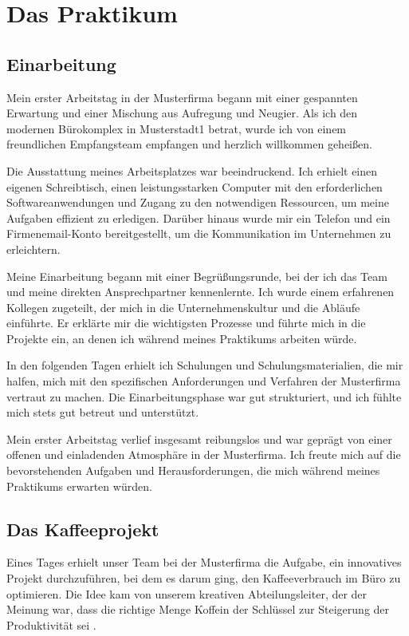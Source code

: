 %
%

\section{Das Praktikum}


\subsection{Einarbeitung}
Mein erster Arbeitstag in der Musterfirma begann mit einer gespannten Erwartung und einer Mischung aus Aufregung und Neugier. Als ich den modernen Bürokomplex in Musterstadt1 betrat, wurde ich von einem freundlichen Empfangsteam empfangen und herzlich willkommen geheißen.

Die Ausstattung meines Arbeitsplatzes war beeindruckend. Ich erhielt einen eigenen Schreibtisch, einen leistungsstarken Computer mit den erforderlichen Softwareanwendungen und Zugang zu den notwendigen Ressourcen, um meine Aufgaben effizient zu erledigen. Darüber hinaus wurde mir ein Telefon und ein Firmenemail-Konto bereitgestellt, um die Kommunikation im Unternehmen zu erleichtern.

Meine Einarbeitung begann mit einer Begrüßungsrunde, bei der ich das Team und meine direkten Ansprechpartner kennenlernte. Ich wurde einem erfahrenen Kollegen zugeteilt, der mich in die Unternehmenskultur und die Abläufe einführte. Er erklärte mir die wichtigsten Prozesse und führte mich in die Projekte ein, an denen ich während meines Praktikums arbeiten würde.

In den folgenden Tagen erhielt ich Schulungen und Schulungsmaterialien, die mir halfen, mich mit den spezifischen Anforderungen und Verfahren der Musterfirma vertraut zu machen. Die Einarbeitungsphase war gut strukturiert, und ich fühlte mich stets gut betreut und unterstützt.

Mein erster Arbeitstag verlief insgesamt reibungslos und war geprägt von einer offenen und einladenden Atmosphäre in der Musterfirma. Ich freute mich auf die bevorstehenden Aufgaben und Herausforderungen, die mich während meines Praktikums erwarten würden.

\subsection{Das Kaffeeprojekt}
Eines Tages erhielt unser Team bei der Musterfirma die Aufgabe, ein innovatives Projekt durchzuführen, bei dem es darum ging, den Kaffeeverbrauch im Büro zu optimieren. Die Idee kam von unserem kreativen Abteilungsleiter, der der Meinung war, dass die richtige Menge Koffein der Schlüssel zur Steigerung der Produktivität sei \cite{lustigeCitation}.

